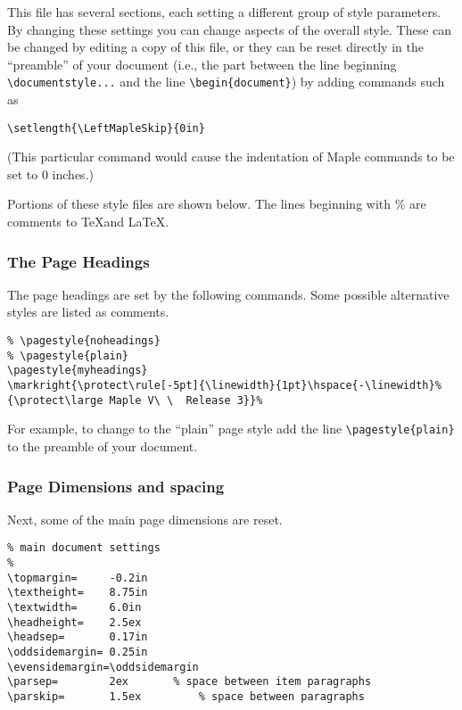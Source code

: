 {This file has several sections, each setting a different group
of style parameters.  By changing these settings you can
change aspects of the overall style.  
These can be changed by editing a copy of
this file, or they can be reset directly in the ``preamble'' of your
document (i.e., the part between the line 
beginning {\tt \backslash documentstyle...}
and the line {\tt \backslash begin\{document\}})
by adding commands such as

\begin{verbatim}
\setlength{\LeftMapleSkip}{0in}
\end{verbatim}

\noindent
(This particular command would cause the indentation of Maple 
commands to be set to 0 inches.)


Portions of these style files are shown below.
The lines beginning with \% are comments to \TeX and \LaTeX.

\subsubsection{The Page Headings}
The page headings are set by the following commands.
Some possible alternative styles are listed as comments.

\begin{verbatim}
% \pagestyle{noheadings}
% \pagestyle{plain}
\pagestyle{myheadings}
\markright{\protect\rule[-5pt]{\linewidth}{1pt}\hspace{-\linewidth}%
{\protect\large Maple V\ \  Release 3}}%
\end{verbatim}

\noindent
For example, to change to the ``plain'' page style add the line
{\tt \backslash pagestyle\{plain\}} to the preamble of 
your document.

\subsubsection{Page Dimensions and spacing}
Next, some of the main page dimensions are reset.

\begin{verbatim}
% main document settings  
%
\topmargin=     -0.2in
\textheight=    8.75in
\textwidth=     6.0in
\headheight=    2.5ex
\headsep=       0.17in
\oddsidemargin= 0.25in
\evensidemargin=\oddsidemargin
\parsep=        2ex		  % space between item paragraphs
\parskip=       1.5ex  		  % space between paragraphs
\end{verbatim}

}
